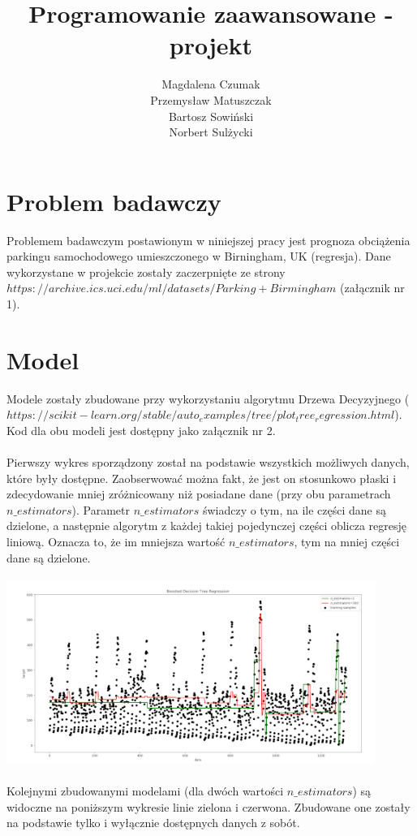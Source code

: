 \documentclass[]{article}
\title{Programowanie zaawansowane - projekt}
\author{Magdalena Czumak \\
Przemysław Matuszczak\\
Bartosz Sowiński\\
Norbert Sulżycki\\
}
\begin{document}
\maketitle



\section{Problem badawczy}
Problemem badawczym postawionym w niniejszej pracy jest prognoza obciążenia parkingu samochodowego umieszczonego w Birningham, UK (regresja). Dane wykorzystane w projekcie zostały zaczerpnięte ze strony\\ $https://archive.ics.uci.edu/ml/datasets/Parking+Birmingham$ (załącznik nr 1).

\section{Model}
Modele zostały zbudowane przy wykorzystaniu algorytmu Drzewa Decyzyjnego ($https://scikit-learn.org/stable/auto_examples/tree/plot_tree_regression.html$). Kod dla obu modeli jest dostępny jako załącznik nr 2.\\
\\
Pierwszy wykres sporządzony został na podstawie wszystkich możliwych danych, które były dostępne. Zaobserwować można fakt, że jest on stosunkowo płaski i zdecydowanie mniej zróżnicowany niż posiadane dane (przy obu parametrach $n\_estimators$). Parametr $n\_estimators$ świadczy o tym, na ile części dane są dzielone, a następnie algorytm z każdej takiej pojedynczej części oblicza regresję liniową. Oznacza to, że im mniejsza wartość $n\_estimators$, tym na mniej części dane są dzielone.\\
\\
\includegraphics[width=12cm]{image-0}\\
\\
Kolejnymi zbudowanymi modelami (dla dwóch wartości $n\_estimators$) są widoczne na poniższym wykresie linie zielona i czerwona. Zbudowane one zostały na podstawie tylko i wyłącznie dostępnych danych z sobót. \\
\end{document}
